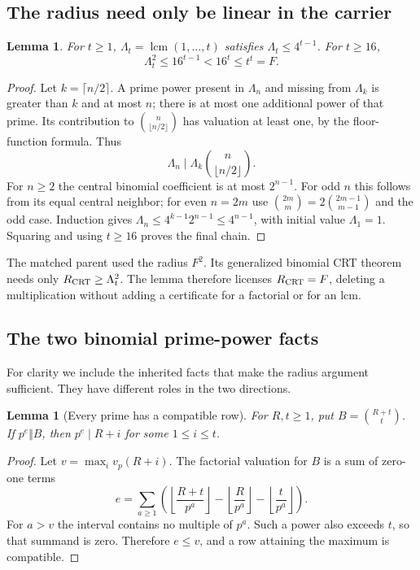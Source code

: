 \documentclass[11pt]{article}
\newtheorem{lemma}[theorem]{Lemma}
\theoremstyle{definition}
\newcommand{\lcm}{\operatorname{lcm}}
\begin{document}
\subsection{The radius need only be linear in the carrier}

\begin{lemma}\label{lem:lcm-bound}
For $t\ge1$, $\Lambda_t=\lcm(1,\ldots,t)$ satisfies
$\Lambda_t\le4^{t-1}$. For $t\ge16$,
\[
\Lambda_t^2\le16^{t-1}<16^t\le t^t=F.
\]
\end{lemma}
\begin{proof}
Let $k=\lceil n/2\rceil$. A prime power present in $\Lambda_n$
and missing from $\Lambda_k$ is greater than $k$ and at most $n$;
there is at most one additional power of that prime. Its contribution
to $\binom n{\lfloor n/2\rfloor}$ has valuation at least one,
by the floor-function formula. Thus
\[
\Lambda_n\mid\Lambda_k\binom n{\lfloor n/2\rfloor}.
\]
For $n\ge2$ the central binomial coefficient is at most $2^{n-1}$.
For odd $n$ this follows from its equal central neighbor; for even
$n=2m$ use $\binom{2m}m=2\binom{2m-1}{m-1}$ and the odd case.
Induction gives
$\Lambda_n\le4^{k-1}2^{n-1}\le4^{n-1}$, with initial value
$\Lambda_1=1$. Squaring and using $t\ge16$ proves the final chain.
\end{proof}

The matched parent used the radius $F^2$. Its generalized binomial
CRT theorem needs only $R_{\rm CRT}\ge\Lambda_t^2$. The lemma
therefore licenses $R_{\rm CRT}=F$, deleting a multiplication without
adding a certificate for a factorial or for an lcm.

\subsection{The two binomial prime-power facts}

For clarity we include the inherited facts that make the radius
argument sufficient. They have different roles in the two directions.

\begin{lemma}[Every prime has a compatible row]\label{lem:all-primes}
For $R,t\ge1$, put $B=\binom{R+t}{t}$. If $p^e\Vert B$, then
$p^e\mid R+i$ for some $1\le i\le t$.
\end{lemma}
\begin{proof}
Let $v=\max_i v_p(R+i)$. The factorial valuation for $B$ is a sum
of zero-one terms
\[
e=\sum_{a\ge1}\left(
\left\lfloor\frac{R+t}{p^a}\right\rfloor-
\left\lfloor\frac R{p^a}\right\rfloor-
\left\lfloor\frac t{p^a}\right\rfloor\right).
\]
For $a>v$ the interval contains no multiple of $p^a$. Such a power
also exceeds $t$, so that summand is zero. Therefore $e\le v$,
and a row attaining the maximum is compatible.
\end{proof}
\end{document}
